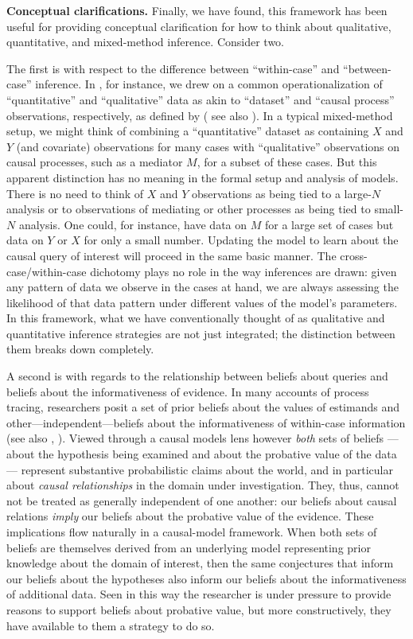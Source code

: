 \documentclass[
  12pt,
]{book}
\begin{document}
\textbf{Conceptual clarifications.} Finally, we have found, this framework has been useful for providing conceptual clarification for how to think about qualitative, quantitative, and mixed-method inference. Consider two.

The first is with respect to the difference between ``within-case'' and ``between-case'' inference. In \citet{humphreys2015mixing}, for instance, we drew on a common operationalization of ``quantitative'' and ``qualitative'' data as akin to ``dataset'' and ``causal process'' observations, respectively, as defined by \citet{collier2010sources} ( see also \citet{mahoney2000strategies}). In a typical mixed-method setup, we might think of combining a ``quantitative'' dataset as containing \(X\) and \(Y\) (and covariate) observations for many cases with ``qualitative'' observations on causal processes, such as a mediator \(M\), for a subset of these cases. But this apparent distinction has no meaning in the formal setup and analysis of models. There is no need to think of \(X\) and \(Y\) observations as being tied to a large-\(N\) analysis or to observations of mediating or other processes as being tied to small-\(N\) analysis. One could, for instance, have data on \(M\) for a large set of cases but data on \(Y\) or \(X\) for only a small number. Updating the model to learn about the causal query of interest will proceed in the same basic manner. The cross-case/within-case dichotomy plays no role in the way inferences are drawn: given any pattern of data we observe in the cases at hand, we are always assessing the likelihood of that data pattern under different values of the model's parameters. In this framework, what we have conventionally thought of as qualitative and quantitative inference strategies are not just integrated; the distinction between them breaks down completely.

A second is with regards to the relationship between beliefs about queries and beliefs about the informativeness of evidence. In many accounts of process tracing, researchers posit a set of prior beliefs about the values of estimands and other---independent---beliefs about the informativeness of within-case information (see also \citet{FairfieldBayes2015}, \citet{BennettAppendix}). Viewed through a causal models lens however \emph{both} sets of beliefs --- about the hypothesis being examined and about the probative value of the data --- represent substantive probabilistic claims about the world, and in particular about \emph{causal relationships} in the domain under investigation. They, thus, cannot not be treated as generally independent of one another: our beliefs about causal relations \emph{imply} our beliefs about the probative value of the evidence. These implications flow naturally in a causal-model framework. When both sets of beliefs are themselves derived from an underlying model representing prior knowledge about the domain of interest, then the same conjectures that inform our beliefs about the hypotheses also inform our beliefs about the informativeness of additional data. Seen in this way the researcher is under pressure to provide reasons to support beliefs about probative value, but more constructively, they have available to them a strategy to do so.
\end{document}

